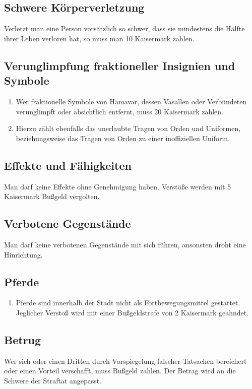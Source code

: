 \documentclass{article}
\begin{document}
\subsection{Schwere Körperverletzung}
Verletzt man eine Person vorsätzlich so schwer, dass sie mindestens die Hälfte ihrer Leben verloren hat, so muss man 10 Kaisermark zahlen.

\subsection{Verunglimpfung fraktioneller Insignien und Symbole}
\begin{enumerate}[(1)]
    \item Wer fraktionelle Symbole von Hamavar, dessen Vasallen oder Verbündeten verunglimpft oder absichtlich entfernt, muss 20 Kaisermark zahlen.
    \item Hierzu zählt ebenfalls das unerlaubte Tragen von Orden und Uniformen, beziehungsweise das Tragen von Orden zu einer inoffiziellen Uniform.    
\end{enumerate}

\subsection{Effekte und Fähigkeiten}
Man darf keine Effekte ohne Genehmigung haben. Verstöße werden mit 5 Kaisermark Bußgeld vergolten.

\subsection{Verbotene Gegenstände}
Man darf keine verbotenen Gegenstände mit sich führen, ansonsten droht eine Hinrichtung.

\subsection{Pferde}
\begin{enumerate}[(1)]
    \item Pferde sind innerhalb der Stadt nicht als Fortbewegungsmittel gestattet. Jeglicher Verstoß wird mit einer Bußgeldstrafe von 2 Kaisermark geahndet. 
\end{enumerate}

\subsection{Betrug}
Wer sich oder einen Dritten durch Vorspiegelung falscher Tatsachen bereichert oder einen Vorteil verschafft, muss Bußgeld zahlen. Der Betrag wird an die Schwere der Straftat angepasst.
\end{document}
